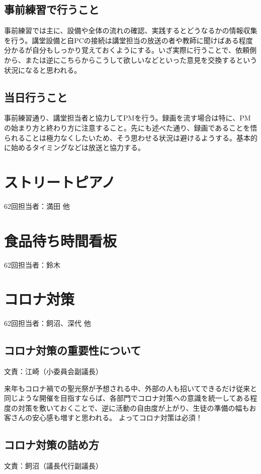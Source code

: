 \documentclass[dvipdfmx,jb5]{jreport}
\begin{document}
\subsection{事前練習で行うこと}
事前練習では主に、設備や全体の流れの確認、実践するとどうなるかの情報収集を行う。講堂設備と自PCの接続は講堂担当の放送の者や教師に聞けばある程度分かるが自分もしっかり覚えておくようにする。いざ実際に行うことで、依頼側から、または逆にこちらからこうして欲しいなどといった意見を交換するという状況になると思われる。

\subsection{当日行うこと}
事前練習通り、講堂担当者と協力してPMを行う。録画を流す場合は特に、PMの始まり方と終わり方に注意すること。先にも述べた通り、録画であることを悟られることは極力なくしたいため、そう思わせる状況は避けるようする。基本的に始めるタイミングなどは放送と協力する。




\section{ストリートピアノ}
62回担当者：満田 他

\section{食品待ち時間看板}\label{sec:食品待ち時間看板}
62回担当者：鈴木

\section{コロナ対策}
62回担当者：飼沼、深代 他

\subsection{コロナ対策の重要性について} 文責：江崎（小委員会副議長） \vspace{2mm}

来年もコロナ禍での聖光祭が予想される中、外部の人も招いてできるだけ従来と同じような開催を目指すならば、各部門でコロナ対策への意識を統一してある程度の対策を敷いておくことで、逆に活動の自由度が上がり、生徒の準備の幅もお客さんの安心感も増すと思われる。
よってコロナ対策は必須！

\subsection{コロナ対策の詰め方} 文責：飼沼（議長代行副議長） \vspace{2mm}
\end{document}
